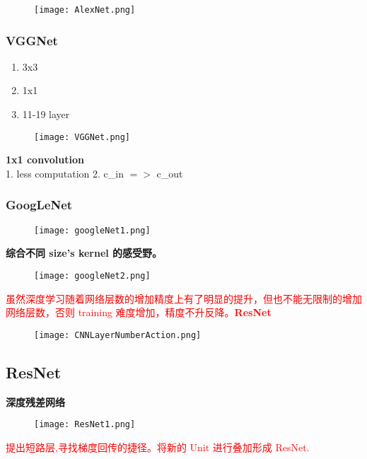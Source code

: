 \begin{figure}[!h]
  \centering
  \texttt{[image: AlexNet.png]}
\end{figure}

\subsubsection{VGGNet}
\begin{enumerate}
  \item 3x3
  \item 1x1
  \item 11-19 layer
\end{enumerate}
\begin{figure}[!h]
  \centering
  \texttt{[image: VGGNet.png]}
\end{figure}

\textbf{1x1 convolution}\\
1. less computation
2. c\_in $=>$ c\_out

\subsubsection{GoogLeNet}
\begin{figure}[!h]
  \centering
  \texttt{[image: googleNet1.png]}
\end{figure}

\textbf{综合不同 size's kernel 的感受野。}

\begin{figure}[!h]
  \centering
  \texttt{[image: googleNet2.png]}
\end{figure}

\textcolor{red}{虽然深度学习随着网络层数的增加精度上有了明显的提升，但也不能无限制的增加网络层数，否则 training 难度增加，精度不升反降。\textbf{ResNet}}
\begin{figure}[!h]
  \centering
  \texttt{[image: CNNLayerNumberAction.png]}
\end{figure}

\subsection{ResNet}
\textbf{深度残差网络}
\begin{figure}[!h]
  \centering
  \texttt{[image: ResNet1.png]}
\end{figure}

\textcolor{red}{提出短路层,寻找梯度回传的捷径。将新的 Unit 进行叠加形成 ResNet.}


